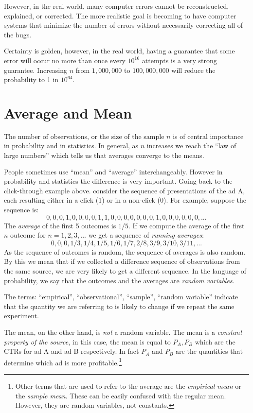 \documentclass{report}
\theoremstyle{plain}
\theoremstyle{definition}
\begin{document}
However, in the real world, many computer errors cannot be
reconstructed, explained, or corrected. The more realistic goal is
becoming to have computer systems that minimize the number of errors
without necessarily correcting all of the bugs.

Certainty is golden, however, in the real world, having a guarantee
that some error will occur no more than once every $10^{16}$ attempts
is a very strong guarantee. Increasing $n$ from $1,000,000$ to
$100,000,000$ will reduce the probability to 1 in $10^{64}$.

\section{Average and Mean}
The number of observations, or the size of the sample $n$ is of
central importance in probability and in statistics. In general, as
$n$ increases we reach the ``law of large numbers'' which tells us
that averages converge to the means.

People sometimes use ``mean'' and ``average'' interchangeably. However
in probability and statistics the difference is very important. Going back to the
click-through example above. consider the sequence of presentations of
the ad A, each resulting either in a click (1) or in a non-click
(0). For example, suppose the sequence is:
\[
0,0,0,1,0,0,0,0,1,1,0,0,0,0,0,0,0,1,0,0,0,0,0,0,...
\] 
The {\em average} of the first 5 outcomes is $1/5$. If we compute
the average of the first $n$ outcome for $n=1,2,3,...$ we get a
sequence of {\em running averages}:
\[
0,0,0,1/3,1/4,1/5,1/6,1/7,2/8,3/9,3/10,3/11,...
\]
As the sequence of outcomes is random, the sequence of averages is
also random. By this we mean that if we collected a difference
sequence of observations from the same source, we are very likely to
get a different sequence. In the language of probability, we say that
the outcomes and the averages are {\em random variables}.

The terms: ``empirical'', ``observational'', ``sample'', ``random
variable'' indicate that the quantity we are referring to is likely to
change if we repeat the same experiment.

The mean, on the other hand, is {\em not} a random variable. The mean
is a {\em constant property of the source}, in this case, the mean is
equal to $P_A,P_B$ which are the CTRs for ad A and ad B
respectively. In fact $P_A$ and $P_B$ are the quantities that
determine which ad is more profitable.\footnote{Other terms that are
  used to refer to the average are the {\em empirical mean} or the
  {\em sample mean}. These can be easily confused with the regular
  mean. However, they are random variables, not constants.}
\end{document}
